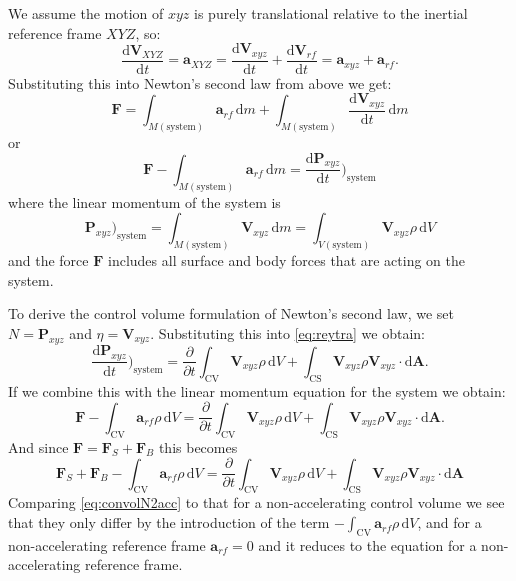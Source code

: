 We assume the motion of $xyz$ is purely translational relative to the inertial reference frame $XYZ$, so:
\[ 
\frac{\mathrm{d}\textbf{V}_{XYZ}}{\mathrm{d}t} = \textbf{a}_{XYZ} = \frac{\mathrm{d}\textbf{V}_{xyz}}{\mathrm{d}t} + \frac{\mathrm{d}\textbf{V}_{rf}}{\mathrm{d}t} = \textbf{a}_{xyz} + \textbf{a}_{rf}
.\]
Substituting this into Newton's second law from above we get:
\[ 
\textbf{F} = \int_{M \left( \mathrm{system} \right)} \textbf{a}_{rf} \, \mathrm{d}m + \int_{M (\mathrm{system})} \frac{\mathrm{d}\textbf{V}_{xyz}}{\mathrm{d}t} \, \mathrm{d}m
\]
or
\[ 
\textbf{F} - \int_{M(\mathrm{system})} \textbf{a}_{rf} \, \mathrm{d}m = \frac{\mathrm{d}\textbf{P}_{xyz}}{\mathrm{d}t} \bigg)_{\mathrm{system}}
\]
where the linear momentum of the system is
\[ 
\textbf{P}_{xyz} )_{\mathrm{system}} = \int_{M (\mathrm{system})} \textbf{V}_{xyz} \, \mathrm{d}m = \int_{V (\mathrm{system})} \textbf{V}_{xyz} \rho \, \mathrm{d}V
\]
and the force $\textbf{F}$ includes all surface and body forces that are acting on the system.

To derive the control volume formulation of Newton's second law, we set $N = \textbf{P}_{xyz}$ and $\eta = \textbf{V}_{xyz}$. Substituting this into \autoref{eq:reytra} we obtain:
\[ 
\frac{\mathrm{d}\textbf{P}_{xyz}}{\mathrm{d}t} \bigg)_{\mathrm{system}} = \frac{\partial }{\partial t} \int_{\mathrm{CV}} \textbf{V}_{xyz} \rho \, \mathrm{d}V + \int_{\mathrm{CS}} \textbf{V}_{xyz} \rho \textbf{V}_{xyz} \cdot \mathrm{d}\textbf{A}
.\]
If we combine this with the linear momentum equation for the system we obtain:
\[ 
\textbf{F} - \int_{\mathrm{CV}} \textbf{a}_{rf} \rho \, \mathrm{d}V = \frac{\partial}{\partial t} \int_{\mathrm{CV}} \textbf{V}_{xyz} \rho \, \mathrm{d}V + \int_{\mathrm{CS}} \textbf{V}_{xyz} \rho \textbf{V}_{xyz} \cdot \mathrm{d}\textbf{A}
.\]
And since $\textbf{F} = \textbf{F}_S + \textbf{F}_B$ this becomes
\begin{equation}\label{eq:convolN2acc}
  \textbf{F}_S + \textbf{F}_B - \int_{\mathrm{CV}} \textbf{a}_{rf} \rho \, \mathrm{d}V = \frac{\partial}{\partial t} \int_{\mathrm{CV}} \textbf{V}_{xyz} \rho \, \mathrm{d}V + \int_{\mathrm{CS}} \textbf{V}_{xyz} \rho \textbf{V}_{xyz} \cdot \mathrm{d}\textbf{A}
\end{equation}
Comparing \autoref{eq:convolN2acc} to that for a non-accelerating control volume we see that they only differ by the introduction of the term $- \int_{\mathrm{CV}} \textbf{a}_{rf} \rho \, \mathrm{d}V$, and for a non-accelerating reference frame $\textbf{a}_{rf} = 0$ and it reduces to the equation for a non-accelerating reference frame. 

